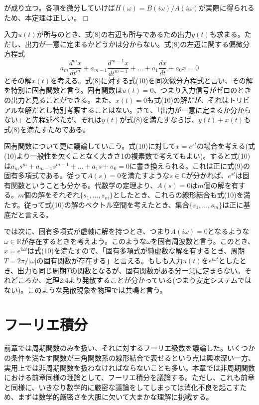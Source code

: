 \documentclass[dvipdfmx, 9pt, a4paper]{jsarticle}
\def\qed{\hfill $\Box$}
\begin{document}
が成り立つ。各項を微分していけば$H(\omega)=B(i\omega)/A(i\omega)$が実際に得られるため、本定理は正しい。\qed \par
入力$u(t)$が所与のとき、式(8)の右辺も所与であるため出力$y(t)$も求まる。ただし、出力が一意に定まるかどうかは分からない。式(8)の左辺に関する偏微分方程式
\begin{equation}
a_m\frac{d^mx}{dt^m}+a_{m-1}\frac{d^{m-1}x}{dt^{m-1}}+...+a_1\frac{dx}{dt}+a_0x=0
\end{equation}
とその解$x(t)$を考える。式(8)に対する式(10)を同次微分方程式と言い、その解を特別に固有関数と言う。固有関数は$u(t)=0$、つまり入力信号がゼロのときの出力と見ることができる。また、$x(t)=0$も式(10)の解だが、それはトリビアルな解だとし特別考察することはない。さて、「出力が一意に定まるか分からない」と先程述べたが、それは$y(t)$が式(8)を満たすならば、$y(t)+x(t)$も式(8)を満たすためである。\par
固有関数について更に議論していこう。式(10)に対して$x=e^{st}$の場合を考える(式(10)より一般性を欠くことなく大きさ1の複素数で考えてもよい)。すると式(10)は$a_ms^m+a_{m-1}s^{m-1}+...+a_1s+a_0=0$に書き換えられる。これは正に式(9)の固有多項式である。従って$A(s)=0$を満たすような$s \in \mathbb{C}$が分かれば、$e^{st}$は固有関数ということも分かる。代数学の定理より、$A(s)=0$は$m$個の解を有する。$m$個の解をそれぞれ$\{ s_1,...,s_m \}$としたとき、これらの線形結合も式(10)を満たす。従って式(10)の解のベクトル空間を考えたとき、集合$\{ s_1,...,s_m \}$は正に基底だと言える。\par
では次に、固有多項式が虚軸に解を持つとき、つまり$A(i\omega)=0$となるような$\omega \in \mathbb{R}$が存在するときを考えよう。このような$\omega$を固有周波数と言う。このとき、$x=e^{i\omega t}$は式(10)を満たすので、「固有多項式が純虚数な解を有するとき、周期$T=2\pi/|\omega|$の固有関数が存在する」と言える。もしも入力$u(t)$を$e^{i\omega t}$としたとき、出力も同じ周期$T$の関数となるが、固有関数がある分一意に定まらない。それどころか、定理2.4より発散することが分かっている(つまり安定システムではない)。このような発散現象を物理では共鳴と言う。

\section{フーリエ積分}
前章では周期関数のみを扱い、それに対するフーリエ級数を議論した。いくつかの条件を満たす関数が三角関数系の線形結合で表せるという点は興味深い一方、実用上では非周期関数を扱わなければならないことも多い。本章では非周期関数における前章同様の理論として、フーリエ積分を議論する。ただし、これも前章と同様に、いきなり数学的に厳密な議論をしてしまっては消化不良を起こすため、まずは数学的厳密さを大胆に欠いて大まかな理解に挑戦する。
\end{document}
